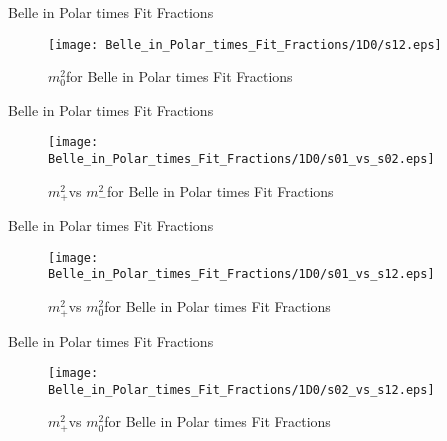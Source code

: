 \documentclass{beamer}
\newcommand{\MP}{\ensuremath{m^2_+}}
\newcommand{\MM}{\ensuremath{m^2_-}}
\newcommand{\MZ}{\ensuremath{m^2_0}}
\begin{document}
\begin{frame}{Belle in Polar times Fit Fractions}
\begin{figure}
\texttt{[image: Belle\_in\_Polar\_times\_Fit\_Fractions/1D0/s12.eps]}
\caption{\MZ for Belle in Polar times Fit Fractions}
\end{figure}
\end{frame}
\begin{frame}{Belle in Polar times Fit Fractions}
\begin{figure}
\texttt{[image: Belle\_in\_Polar\_times\_Fit\_Fractions/1D0/s01\_vs\_s02.eps]}
\caption{\MP vs \MM for Belle in Polar times Fit Fractions}
\end{figure}
\end{frame}
\begin{frame}{Belle in Polar times Fit Fractions}
\begin{figure}
\texttt{[image: Belle\_in\_Polar\_times\_Fit\_Fractions/1D0/s01\_vs\_s12.eps]}
\caption{\MP vs \MZ for Belle in Polar times Fit Fractions}
\end{figure}
\end{frame}
\begin{frame}{Belle in Polar times Fit Fractions}
\begin{figure}
\texttt{[image: Belle\_in\_Polar\_times\_Fit\_Fractions/1D0/s02\_vs\_s12.eps]}
\caption{\MP vs \MZ for Belle in Polar times Fit Fractions}
\end{figure}
\end{frame}
\end{document}
